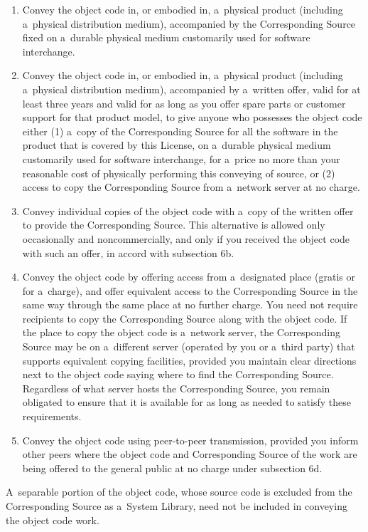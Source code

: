 \documentclass[a4paper, 11pt, twoside]{article}
\begin{document}
\begin{enumerate}[label=\Alph*)]
\item Convey the object code in, or embodied in, a~physical product (including a~physical distribution medium), accompanied by the Corresponding Source fixed on a~durable physical medium customarily used for software interchange.
\item Convey the object code in, or embodied in, a~physical product (including a~physical distribution medium), accompanied by a~written offer, valid for at least three years and valid for as long as you offer spare parts or customer support for that product model, to give anyone who possesses the object code either (1) a~copy of the Corresponding Source for all the software in the product that is covered by this License, on a~durable physical medium customarily used for software interchange, for a~price no more than your reasonable cost of physically performing this conveying of source, or (2) access to copy the Corresponding Source from a~network server at no charge.
\item Convey individual copies of the object code with a~copy of the written offer to provide the Corresponding Source. This alternative is allowed only occasionally and noncommercially, and only if you received the object code with such an offer, in accord with subsection 6b.
\item Convey the object code by offering access from a~designated place (gratis or for a~charge), and offer equivalent access to the Corresponding Source in the same way through the same place at no further charge. You need not require recipients to copy the Corresponding Source along with the object code. If the place to copy the object code is a~network server, the Corresponding Source may be on a~different server (operated by you or a~third party) that supports equivalent copying facilities, provided you maintain clear directions next to the object code saying where to find the Corresponding Source. Regardless of what server hosts the Corresponding Source, you remain obligated to ensure that it is available for as long as needed to satisfy these requirements.
\item Convey the object code using peer-to-peer transmission, provided you inform other peers where the object code and Corresponding Source of the work are being offered to the general public at no charge under subsection 6d.
\end{enumerate}

A~separable portion of the object code, whose source code is excluded from the Corresponding Source as a~System Library, need not be included in conveying the object code work.
\end{document}
